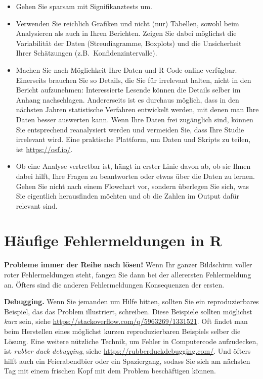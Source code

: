 \documentclass[oneside, 10pt]{book}\usepackage[]{graphicx}\usepackage[]{xcolor}
\begin{document}
\begin{itemize}
  \item Gehen Sie sparsam mit Signifikanztests um.

  \item Verwenden Sie reichlich Grafiken und nicht (nur) Tabellen,
  sowohl beim Analysieren als auch in Ihren Berichten.
  Zeigen Sie dabei möglichst die Variabilität der Daten
  (Streudiagramme, Boxplots) und die Unsicherheit Ihrer
  Schätzungen (z.B.\ Konfidenzintervalle).

  \item Machen Sie nach Möglichkeit Ihre Daten und R-Code
  online verfügbar. 
  Einerseits brauchen Sie so Details,
  die Sie für irrelevant halten, nicht in den Bericht aufzunehmen:
  Interessierte Lesende können die Details selber im Anhang
  nachschlagen.
  Andererseits ist es durchaus möglich, dass in den nächsten
  Jahren statistische Verfahren entwickelt werden, mit denen
  man Ihre Daten besser auswerten kann. Wenn Ihre Daten
  frei zugänglich sind, können Sie entsprechend reanalysiert
  werden und vermeiden Sie, dass Ihre Studie irrelevant wird.
  Eine praktische Plattform, um Daten und Skripts zu teilen,
  ist \url{https://osf.io/}.
  
  \item Ob eine Analyse vertretbar ist,
  hängt in erster Linie davon ab, ob sie Ihnen dabei hilft,
  Ihre Fragen zu beantworten oder etwas über die Daten
  zu lernen. Gehen Sie nicht nach einem Flowchart vor,
  sondern überlegen Sie sich, was Sie eigentlich herausfinden
  möchten und ob die Zahlen im Output dafür relevant sind.
\end{itemize}
\appendix


\chapter{Häufige Fehlermeldungen in R}\label{ch:fehlermeldungen}

\begin{framed}
\textbf{Probleme immer der Reihe nach lösen!}
Wenn Ihr ganzer Bildschirm voller roter Fehlermeldungen
steht, fangen Sie dann bei der allerersten Fehlermeldung
an. Öfters sind die anderen Fehlermeldungen Konsequenzen
der ersten.
\end{framed}

\medskip

\begin{framed}
\textbf{Debugging.}
Wenn Sie jemanden um Hilfe bitten, sollten Sie
ein reproduzierbares Beispiel, das das Problem illustriert,
schreiben. Diese Beispiele sollten möglichst \emph{kurz}
sein, siehe \url{https://stackoverflow.com/q/5963269/1331521}.
Oft findet man beim Herstellen eines möglichst kurzen reproduzierbaren
Beispiels selber die Lösung.
Eine weitere nützliche Technik, um 
Fehler in Computercode aufzudecken, ist
\textit{rubber duck debugging}, siehe
\url{https://rubberduckdebugging.com/}.
Und öfters hilft auch ein Feierabendbier oder ein Spaziergang,
sodass Sie sich am nächsten Tag mit einem frischen Kopf mit dem Problem
beschäftigen können.
\end{framed}
\end{document}
